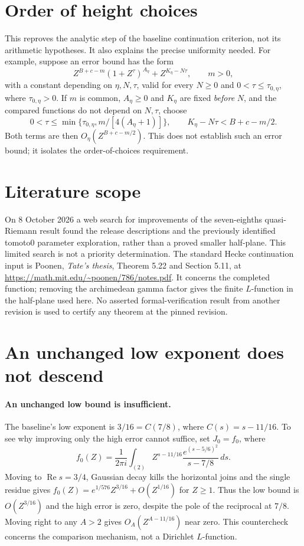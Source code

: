 \documentclass[12pt]{article}
\newcommand{\Rea}{\operatorname{Re}}
\begin{document}
\section{Order of height choices}
This reproves the analytic step of
the baseline continuation criterion,
not its arithmetic hypotheses.  It also explains the precise
uniformity needed.  For example, suppose an error bound has the form
\[
 Z^{B+c-m}(1+Z^\tau)^{A_\eta}
           +Z^{K_\eta-N\tau},\qquad m>0,
\]
with a constant depending on \(\eta,N,\tau\), valid for every
\(N\geq0\) and \(0<\tau\leq\tau_{0,\eta}\), where \(\tau_{0,\eta}>0\).
If \(m\) is common, \(A_\eta\geq0\) and \(K_\eta\) are fixed
\emph{before} \(N\), and the compared functions do not depend on
\(N,\tau\), choose
\[
 0<\tau\leq\min\{\tau_{0,\eta},m/[4(A_\eta+1)]\},\qquad
 K_\eta-N\tau<B+c-m/2.
\]
Both terms are then \(O_\eta(Z^{B+c-m/2})\).
This does not establish such an error bound; it isolates the
order-of-choices requirement.


\section{Literature scope}
On 8 October 2026 a web search for improvements of the seven-eighths
quasi-Riemann result found the release descriptions and the previously
identified tomoto0 parameter exploration, rather than a proved smaller
half-plane.  This limited search is not a priority determination.
The standard Hecke continuation input is Poonen, \emph{Tate's thesis},
Theorem 5.22 and Section 5.11, at
\url{https://math.mit.edu/~poonen/786/notes.pdf}.
It concerns the completed function; removing the archimedean gamma factor
gives the finite \(L\)-function in the half-plane used here.
No asserted formal-verification result from another revision is used
to certify any theorem at the pinned revision.
\section{An unchanged low exponent does not descend}
\paragraph{An unchanged low bound is insufficient.}
The baseline's low exponent is \(3/16=C(7/8)\), where
\(C(s)=s-11/16\).  To see why improving only the high error cannot
suffice, set \(J_0=f_0\), where
\[
 f_0(Z)=\frac1{2\pi i}\int_{(2)}
   Z^{s-11/16}\frac{e^{(s-5/6)^2}}{s-7/8}\,ds .
\]
Moving to \(\Rea s=3/4\), Gaussian decay kills the horizontal joins
and the single residue gives
\(f_0(Z)=e^{1/576}Z^{3/16}+O(Z^{1/16})\) for \(Z\geq1\).
Thus the low bound is \(O(Z^{3/16})\) and the high error is zero,
despite the pole of the reciprocal at \(7/8\).
Moving right to any \(A>2\) gives \(O_A(Z^{A-11/16})\) near zero.
This countercheck concerns the comparison mechanism, not a Dirichlet
\(L\)-function.
\end{document}
